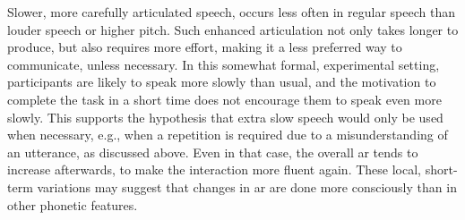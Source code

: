 Slower, more carefully articulated speech, occurs less often in regular speech than louder speech or higher pitch.
Such enhanced articulation not only takes longer to produce, but also requires more effort, making it a less preferred way to communicate, unless necessary.
In this somewhat formal, experimental setting, participants are likely to speak more slowly than usual, and the motivation to complete the task in a short time does not encourage them to speak even more slowly.
This supports the hypothesis that extra slow speech would only be used when necessary, e.g., when a repetition is required due to a misunderstanding of an utterance, as discussed above.
Even in that case, the overall \ac{ar} tends to increase afterwards, to make the interaction more fluent again.
These local, short-term variations may suggest that changes in \ac{ar} are done more consciously than in other phonetic features.

